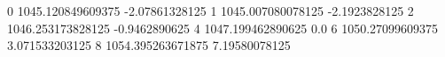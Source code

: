 0 1045.120849609375 -2.07861328125
1 1045.007080078125 -2.1923828125
2 1046.253173828125 -0.9462890625
4 1047.199462890625 0.0
6 1050.27099609375 3.071533203125
8 1054.395263671875 7.19580078125
